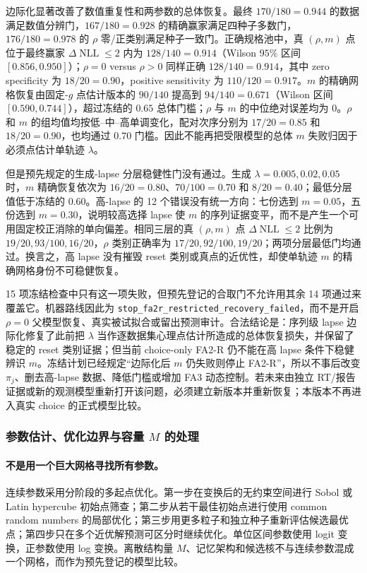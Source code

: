 边际化显著改善了数值重复性和两参数的总体恢复。最终 $170/180=0.944$ 的数据满足数值分辨门，$167/180=0.928$ 的精确赢家满足四种子多数门，$176/180=0.978$ 的 $\rho$ 零/正类别满足种子一致门。正确规格池中，真 $(\rho,m)$ 点位于最终赢家 $\Delta\operatorname{NLL}\leq2$ 内为 $128/140=0.914$（Wilson $95\%$ 区间 $[0.856,0.950]$）；$\rho=0$ versus $\rho>0$ 同样正确 $128/140=0.914$，其中 zero specificity 为 $18/20=0.90$，positive sensitivity 为 $110/120=0.917$。$m$ 的精确网格恢复由固定-$g$ 点估计版本的 $90/140$ 提高到 $94/140=0.671$（Wilson 区间 $[0.590,0.744]$），超过冻结的 $0.65$ 总体门槛；$\rho$ 与 $m$ 的中位绝对误差均为 0。$\rho$ 和 $m$ 的组均值均按低--中--高单调变化，配对次序分别为 $17/20=0.85$ 和 $18/20=0.90$，也均通过 $0.70$ 门槛。因此不能再把受限模型的总体 $m$ 失败归因于必须点估计单轨迹 $\lambda$。

但是预先规定的生成-lapse 分层稳健性门没有通过。生成 $\lambda=0.005,0.02,0.05$ 时，$m$ 精确恢复依次为 $16/20=0.80$、$70/100=0.70$ 和 $8/20=0.40$；最低分层值低于冻结的 $0.60$。高-lapse 的 12 个错误没有统一方向：七份选到 $m=0.05$，五份选到 $m=0.30$，说明较高选择 lapse 使 $m$ 的序列证据变平，而不是产生一个可用固定校正消除的单向偏差。相同三层的真 $(\rho,m)$ 点 $\Delta\operatorname{NLL}\leq2$ 比例为 $19/20,93/100,16/20$，$\rho$ 类别正确率为 $17/20,92/100,19/20$；两项分层最低门均通过。换言之，高 lapse 没有摧毁 reset 类别或真点的近优性，却使单轨迹 $m$ 的精确网格身份不可稳健恢复。

15 项冻结检查中只有这一项失败，但预先登记的合取门不允许用其余 14 项通过来覆盖它。机器路线因此为 \texttt{stop\_fa2r\_restricted\_recovery\_failed}，而不是开启 $\rho=0$ 父模型恢复、真实被试拟合或留出预测审计。合法结论是：序列级 lapse 边际化修复了此前把 $\lambda$ 当作逐数据集心理点估计所造成的总体恢复损失，并保留了稳定的 reset 类别证据；但当前 choice-only FA2-R 仍不能在高 lapse 条件下稳健辨识 $m$。冻结计划已经规定“边际化后 $m$ 仍失败则停止 FA2-R”，所以不事后改变 $\pi_j$、删去高-lapse 数据、降低门槛或增加 FA3 动态控制。若未来由独立 RT/报告证据或新的观测模型重新打开该问题，必须建立新版本并重新恢复；本版本不再进入真实 choice 的正式模型比较。


\subsubsection{参数估计、优化边界与容量 \texorpdfstring{$M$}{M} 的处理}

\paragraph{不是用一个巨大网格寻找所有参数。}
连续参数采用分阶段的多起点优化。第一步在变换后的无约束空间进行 Sobol 或 Latin hypercube 初始点筛查；第二步从若干最佳初始点进行使用 common random numbers 的局部优化；第三步用更多粒子和独立种子重新评估候选最优点；第四步只在多个近优解预测可区分时继续优化。单位区间参数使用 logit 变换，正参数使用 log 变换。离散结构量 $M$、记忆架构和候选核不与连续参数混成一个网格，而作为预先登记的模型比较。

